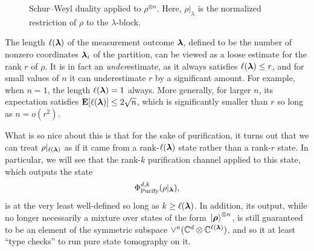 \documentclass{article}
\newcommand{\purifychan}{\Phi_{\mathrm{Purify}}}
\begin{document}
{
\begin{figure}
\centering
\usetikzlibrary{arrows.meta}
\caption{Schur--Weyl duality applied to $\rho^{\otimes n}$. Here, $\rho|_{\lambda}$ is the normalized restriction of $\rho$ to the $\lambda$-block.}
\label{fig:schur-weyl}
\end{figure}
}

The length $\ell(\boldsymbol{\lambda})$ of the measurement outcome $\boldsymbol{\lambda}$, defined to be the number of nonzero coordinates $\boldsymbol{\lambda}_i$ of the partition, can be viewed as a loose estimate for the rank $r$ of $\rho$.
It is in fact an \emph{under}estimate,
as it always satisfies $\ell(\boldsymbol{\lambda}) \leq r$,
and for small values of $n$ it can underestimate $r$ by a significant amount.
For example, when $n = 1$, the length $\ell(\boldsymbol{\lambda}) = 1$ always.
More generally, for larger $n$, its expectation satisfies $\mathop{\bf E\/}[\ell(\boldsymbol{\lambda})] \leq 2 \sqrt{n}$, which is significantly smaller than $r$ so long as $n = o(r^2)$.

What is so nice about this is that for the sake of purification, it turns out that we can treat $\rho|_{\ell(\boldsymbol{\lambda})}$ as if it came from a rank-$\ell(\boldsymbol{\lambda})$ state rather than a rank-$r$ state.
In particular, we will see that the rank-$k$ purification channel applied to this state, which outputs the state
\begin{equation*}\purifychan^{d, k}(\rho|_{\blambda}),
\end{equation*}
is at the very least well-defined so long as $k \geq \ell(\boldsymbol{\lambda})$.
In addition, its output, while no longer necessarily a mixture over states of the form $\ket*{\boldsymbol{\rho}}^{\otimes n}$, is still guaranteed to be an element of the symmetric subspace $\lor^n (\mathbb C^d \otimes \mathbb C^{\ell(\boldsymbol{\lambda})})$, and so it at least ``type checks'' to run pure state tomography on it.
\end{document}
